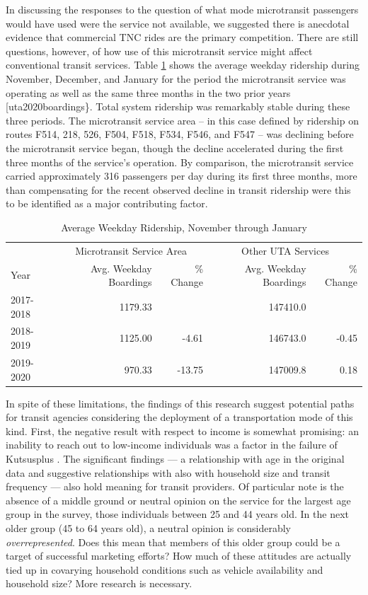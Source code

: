 \documentclass[smartcities,article,submit,moreauthors,pdftex]{mdpi}
\begin{document}
In discussing the responses to the question of what mode microtransit passengers
would have used were the service not available, we suggested there is anecdotal
evidence that commercial TNC rides are the primary competition. There are still
questions, however, of how use of this microtransit service might affect
conventional transit services. Table \ref{tab:uta-ridership} shows the average
weekday ridership during November, December, and January for the period the
microtransit service was operating as well as the same three months in the two
prior years {[}uta2020boardings\}. Total system ridership was remarkably stable
during these three periods. The microtransit service area -- in this case
defined by ridership on routes F514, 218, 526, F504, F518, F534, F546, and F547
-- was declining before the microtransit service began, though the decline
accelerated during the first three months of the service's operation. By
comparison, the microtransit service carried approximately 316 passengers per
day during its first three months, more than compensating for the recent
observed decline in transit ridership were this to be identified as a major
contributing factor.

\begin{table}

\caption{\label{tab:uta-ridership}Average Weekday Ridership, November through January}
\centering
\begin{tabular}[t]{lrrrr}
\toprule
\multicolumn{1}{c}{ } & \multicolumn{2}{c}{Microtransit Service Area} & \multicolumn{2}{c}{Other UTA Services} \\
\cmidrule(l{3pt}r{3pt}){2-3} \cmidrule(l{3pt}r{3pt}){4-5}
Year & Avg. Weekday Boardings & \% Change & Avg. Weekday Boardings & \% Change\\
\midrule
2017-2018 & 1179.33 &  & 147410.0 & \\
2018-2019 & 1125.00 & -4.61 & 146743.0 & -0.45\\
2019-2020 & 970.33 & -13.75 & 147009.8 & 0.18\\
\bottomrule
\end{tabular}
\end{table}

In spite of these limitations, the findings of this research suggest potential
paths for transit agencies considering the deployment of a transportation mode
of this kind. First, the negative result with respect to income is somewhat
promising: an inability to reach out to low-income individuals was a factor in
the failure of Kutsusplus \citep{weckstrom2018}. The significant findings --- a
relationship with age in the original data and suggestive relationships with
also with household size and transit frequency --- also hold meaning for transit
providers. Of particular note is the absence of a middle ground or neutral
opinion on the service for the largest age group in the survey, those
individuals between 25 and 44 years old. In the next older group (45 to 64 years
old), a neutral opinion is considerably \emph{overrepresented}. Does this mean
that members of this older group could be a target of successful marketing
efforts? How much of these attitudes are actually tied up in covarying household
conditions such as vehicle availability and household size? More research is
necessary.
\end{document}
